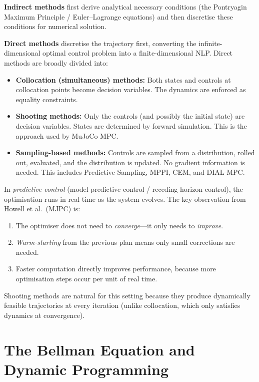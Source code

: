 \documentclass[11pt,twoside]{report}
\theoremstyle{definition}
\theoremstyle{plain}
\theoremstyle{remark}
\newcommand{\0}{\bm{0}}
\begin{document}
\textbf{Indirect methods} first derive analytical necessary conditions
(the Pontryagin Maximum Principle / Euler--Lagrange equations) and
then discretise these conditions for numerical solution.

\textbf{Direct methods} discretise the trajectory first, converting
the infinite-dimensional optimal control problem into a finite-dimensional
NLP.  Direct methods are broadly divided into:
\begin{itemize}
\item \textbf{Collocation (simultaneous) methods:} Both states and controls
at collocation points become decision variables.  The dynamics are
enforced as equality constraints.
\item \textbf{Shooting methods:} Only the controls (and possibly the initial
state) are decision variables.  States are determined by forward
simulation.  This is the approach used by MuJoCo MPC.
\item \textbf{Sampling-based methods:} Controls are sampled from a distribution,
rolled out, evaluated, and the distribution is updated.  No gradient
information is needed.  This includes Predictive Sampling, MPPI,
CEM, and DIAL-MPC.
\end{itemize}

\begin{insightbox}
In \emph{predictive control} (model-predictive control / receding-horizon
control), the optimisation runs in real time as the system evolves.
The key observation from Howell et al.\ (MJPC) is:
\begin{enumerate}
\item The optimiser does not need to \emph{converge}---it only needs to
      \emph{improve}.
\item \emph{Warm-starting} from the previous plan means only small
      corrections are needed.
\item Faster computation directly improves performance, because
      more optimisation steps occur per unit of real time.
\end{enumerate}
Shooting methods are natural for this setting because they produce
dynamically feasible trajectories at every iteration (unlike
collocation, which only satisfies dynamics at convergence).
\end{insightbox}

\section{The Bellman Equation and Dynamic Programming}
\label{sec:bellman}
\end{document}
